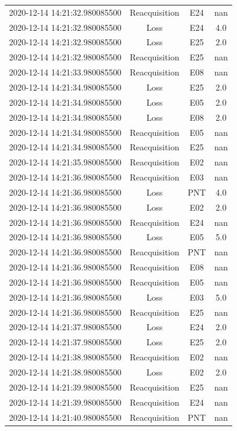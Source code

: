\begin{enumerate}
\begin{longtabu}{cccc}
2020{-}12{-}14 14:21:32.980085500&Reacquisition&E24&nan\\%
2020{-}12{-}14 14:21:32.980085500&Loss&E24&4.0\\%
2020{-}12{-}14 14:21:32.980085500&Loss&E25&2.0\\%
2020{-}12{-}14 14:21:32.980085500&Reacquisition&E25&nan\\%
2020{-}12{-}14 14:21:33.980085500&Reacquisition&E08&nan\\%
2020{-}12{-}14 14:21:34.980085500&Loss&E25&2.0\\%
2020{-}12{-}14 14:21:34.980085500&Loss&E05&2.0\\%
2020{-}12{-}14 14:21:34.980085500&Loss&E08&2.0\\%
2020{-}12{-}14 14:21:34.980085500&Reacquisition&E05&nan\\%
2020{-}12{-}14 14:21:34.980085500&Reacquisition&E25&nan\\%
2020{-}12{-}14 14:21:35.980085500&Reacquisition&E02&nan\\%
2020{-}12{-}14 14:21:36.980085500&Reacquisition&E03&nan\\%
2020{-}12{-}14 14:21:36.980085500&Loss&PNT&4.0\\%
2020{-}12{-}14 14:21:36.980085500&Loss&E02&2.0\\%
2020{-}12{-}14 14:21:36.980085500&Reacquisition&E24&nan\\%
2020{-}12{-}14 14:21:36.980085500&Loss&E05&5.0\\%
2020{-}12{-}14 14:21:36.980085500&Reacquisition&PNT&nan\\%
2020{-}12{-}14 14:21:36.980085500&Reacquisition&E08&nan\\%
2020{-}12{-}14 14:21:36.980085500&Reacquisition&E05&nan\\%
2020{-}12{-}14 14:21:36.980085500&Loss&E03&5.0\\%
2020{-}12{-}14 14:21:36.980085500&Reacquisition&E25&nan\\%
2020{-}12{-}14 14:21:37.980085500&Loss&E24&2.0\\%
2020{-}12{-}14 14:21:37.980085500&Loss&E25&2.0\\%
2020{-}12{-}14 14:21:38.980085500&Reacquisition&E02&nan\\%
2020{-}12{-}14 14:21:38.980085500&Loss&E02&2.0\\%
2020{-}12{-}14 14:21:39.980085500&Reacquisition&E25&nan\\%
2020{-}12{-}14 14:21:39.980085500&Reacquisition&E24&nan\\%
2020{-}12{-}14 14:21:40.980085500&Reacquisition&PNT&nan\\%

\end{longtabu}
\end{enumerate}
